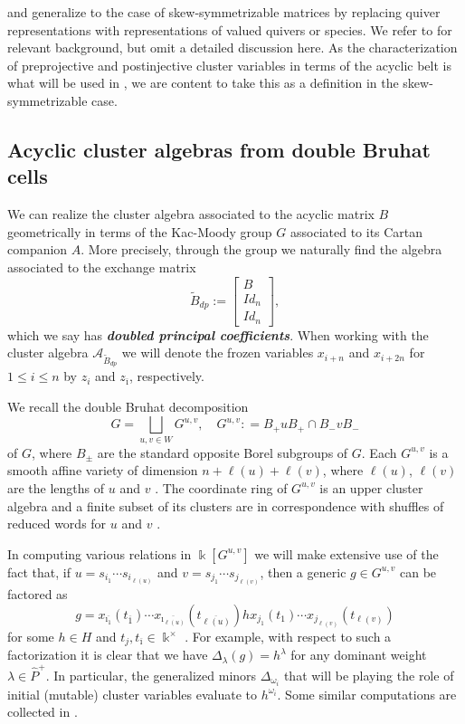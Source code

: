 \documentclass[12pt]{amsart}
\newcommand{\newword}[1]{\textbf{\emph{#1}}}
\newcommand{\cA}{\mathcal{A}}
\newcommand{\kk}{\Bbbk}
\newcommand{\ol}[1]{\overline{#1}}
\newcommand{\Bdp}{\widetilde{B}_{dp}}
\newcommand{\cvar}{z}
\theoremstyle{remark}
\numberwithin{equation}{section}
\numberwithin{figure}{section}
\begin{document}
 and  generalize to the case of skew-symmetrizable matrices by replacing quiver representations with representations of valued quivers or species.
We refer to \cite{Ru11,Ru15} for relevant background, but omit a detailed discussion here. 
As the characterization of preprojective and postinjective cluster variables in terms of the acyclic belt is what will be used in , we are content to take this as a definition in the skew-symmetrizable case. 

\subsection{Acyclic cluster algebras from double Bruhat cells}\label{sec:Coxeterdbc}

We can realize the cluster algebra associated to the acyclic matrix $B$ geometrically in terms of the Kac-Moody group $G$ associated to its Cartan companion $A$.
More precisely, through the group we naturally find the algebra associated to the exchange matrix
\[
  \Bdp := \begin{bmatrix} B \\ Id_n \\ Id_n \end{bmatrix},
\]
which we say has \newword{doubled principal coefficients}.
When working with the cluster algebra $\cA_{\Bdp}$ we will denote the frozen variables $x_{i+n}$ and $x_{i+2n}$ for $1 \leq i \leq n$ by $\cvar_i$ and $\cvar_{\ol{\imath}}$, respectively.

We recall the double Bruhat decomposition
\[
  G = \bigsqcup_{u,v \in W} G^{u,v},\quad G^{u,v} : = B_+ u B_+ \cap B_- v B_-
\]
of $G$, where $B_{\pm}$ are the standard opposite Borel subgroups of $G$.
Each $G^{u,v}$ is a smooth affine variety of dimension $n + \ell(u) + \ell(v)$, where $\ell(u)$, $\ell(v)$ are the lengths of $u$ and $v$ \cite{FZ99,Wil13}.
The coordinate ring of $G^{u,v}$ is an upper cluster algebra and a finite subset of its clusters are in correspondence with shuffles of reduced words for $u$ and $v$ \cite{BFZ05,Wil13}.

In computing various relations in $\kk[G^{u,v}]$ we will make extensive use of the fact that, if $u=s_{i_1}\cdots s_{i_{\ell(u)}}$ and $v=s_{j_1}\cdots s_{j_{\ell(v)}}$, then a generic $g \in G^{u,v}$ can be factored as
\begin{equation}
  \label{eq:uvfactorization}
  g = x_{\ol{\imath_1}}(t_{\ol{1}})\cdots x_{\ol{\imath_{\ell(u)}}}(t_{\ol{\ell(u)}})hx_{j_1}(t_{1}) \cdots x_{j_{\ell(v)}}(t_{\ell(v)})
\end{equation}
for some $h \in H$ and $t_j, t_{\ol{\imath}} \in \kk^\times$ \cite{FZ99,Wil13}.
For example, with respect to such a factorization it is clear that we have $\Delta_\lambda(g) = h^\lambda$ for any dominant weight $\lambda \in \widehat{P}^+$.
In particular, the generalized minors $\Delta_{\omega_i}$ that will be playing the role of initial (mutable) cluster variables evaluate to $h^{\omega_i}$.
Some similar computations are collected in .
\end{document}
